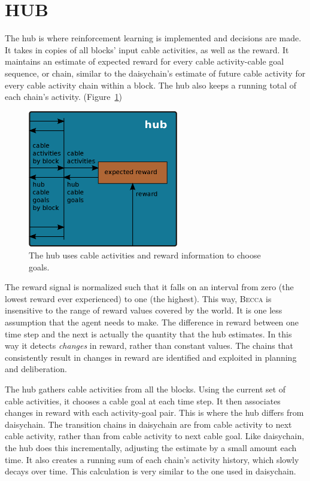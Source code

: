 \documentclass[oneside,twocolumn]{article}
\begin{document}
\section*{\color{copper} HUB}

The hub is where reinforcement learning is implemented and decisions are made. It takes in copies of all blocks' input cable activities, as well as the reward. It maintains an estimate of expected reward for every cable activity-cable goal sequence, or chain, similar to the daisychain's estimate of future cable activity for every cable activity chain within a block. The hub also keeps a running total of each chain's activity. (Figure~\ref{hub})  

\begin{figure}[ht]
\centering
\includegraphics[height=6.0cm]{figs/hub.png}
\caption{The hub uses cable activities and reward information to choose goals.}
\label{hub}
\end{figure}

The reward signal is normalized such that it falls on an interval from zero (the lowest reward ever experienced) to one (the highest). This way, \textsc{Becca} is insensitive to the range of reward values covered by the world. It is one less assumption that the agent needs to make. The  difference in reward between one time step and the next is actually the quantity that the hub estimates. In this way it detects {\em changes} in reward, rather than constant values. The chains that consistently result in changes in reward are identified and exploited in planning and deliberation. 
 
The hub gathers cable activities from all the blocks. Using the current set of cable activities, it chooses a cable goal at each time step. It then associates changes in reward with each activity-goal pair. This is where the hub differs from daisychain. The transition chains in daisychain are from cable activity to next cable activity, rather than from cable activity to next cable goal. Like daisychain, the hub does this incrementally, adjusting the estimate by a small amount each time. It also creates a running sum of each chain's activity history, which slowly decays over time. This calculation is very similar to the one used in daisychain.
\end{document}
